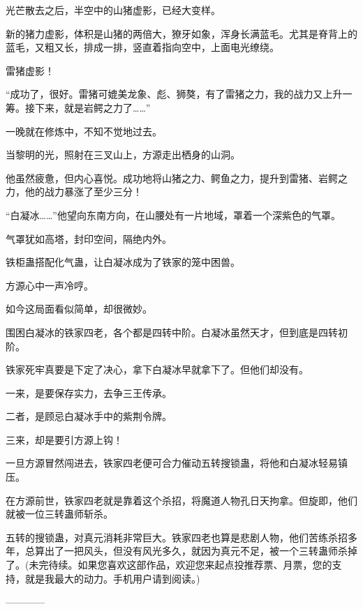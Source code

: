 \begin{this_body}
光芒散去之后，半空中的山猪虚影，已经大变样。

新的猪力虚影，体积是山猪的两倍大，獠牙如象，浑身长满蓝毛。尤其是脊背上的蓝毛，又粗又长，排成一排，竖直着指向空中，上面电光缭绕。

雷猪虚影！

“成功了，很好。雷猪可媲美龙象、彪、狮獒，有了雷猪之力，我的战力又上升一筹。接下来，就是岩鳄之力了……”

一晚就在修炼中，不知不觉地过去。

当黎明的光，照射在三叉山上，方源走出栖身的山洞。

他虽然疲惫，但内心喜悦。成功地将山猪之力、鳄鱼之力，提升到雷猪、岩鳄之力，他的战力暴涨了至少三分！

“白凝冰……”他望向东南方向，在山腰处有一片地域，罩着一个深紫色的气罩。

气罩犹如高塔，封印空间，隔绝内外。

铁柜蛊搭配化气蛊，让白凝冰成为了铁家的笼中困兽。

方源心中一声冷哼。

如今这局面看似简单，却很微妙。

围困白凝冰的铁家四老，各个都是四转中阶。白凝冰虽然天才，但到底是四转初阶。

铁家死牢真要是下定了决心，拿下白凝冰早就拿下了。但他们却没有。

一来，是要保存实力，去争三王传承。

二者，是顾忌白凝冰手中的紫荆令牌。

三来，却是要引方源上钩！

一旦方源冒然闯进去，铁家四老便可合力催动五转搜锁蛊，将他和白凝冰轻易镇压。

在方源前世，铁家四老就是靠着这个杀招，将魔道人物孔日天拘拿。但旋即，他们就被一位三转蛊师斩杀。

五转的搜锁蛊，对真元消耗非常巨大。铁家四老也算是悲剧人物，他们苦练杀招多年，总算出了一把风头，但没有风光多久，就因为真元不足，被一个三转蛊师杀掉了。(未完待续。如果您喜欢这部作品，欢迎您来起点投推荐票、月票，您的支持，就是我最大的动力。手机用户请到阅读。)

------------

\end{this_body}

